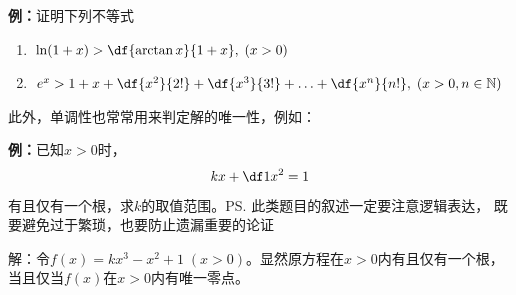 {\bf 例：}证明下列不等式
\begin{enumerate}[(1)]
  \setlength{\itemindent}{1cm}
  \item $\ln(1+x)>\df{\arctan x}{1+x},\;(x>0)$
  \item $e^x>1+x+\df
  {x^2}{2!}+\df{x^3}{3!}+\ldots+\df{x^n}{n!},\;(x>0,n\in\mathbb{N})$
\end{enumerate}

\begin{center}
	\quad
\end{center}

此外，单调性也常常用来判定解的唯一性，例如：

{\bf 例：}已知$x>0$时，
$$kx+\df1{x^2}=1$$
有且仅有一个根，求$k$的取值范围。\ps{此类题目的叙述一定要注意逻辑表达，
既要避免过于繁琐，也要防止遗漏重要的论证}

解：令$f(x)=kx^3-x^2+1\;(x>0)$。显然原方程在$x>0$内有且仅有一个根，
当且仅当$f(x)$在$x>0$内有唯一零点。

